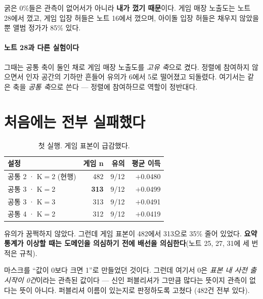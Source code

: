 \documentclass[10pt]{article}
\begin{document}
굵은 0\%들은 관측이 없어서가 아니라 \textbf{내가 껐기 때문}이다. 게임 매장
노출도는 노트 28에서 껐고, 게임 입장 허들은 노트 16에서 껐으며, 아이돌 입장
허들은 채우지 않았을 뿐 앨범 정가가 85\% 있다.

\paragraph{노트 28과 다른 실험이다}
그때는 공통 축이 둘인 채로 게임 매장 노출도를 \emph{고유 축}으로 켰다. 정렬에
참여하지 않으면서 인자 공간의 기하만 흔들어 유의가 6에서 5로 떨어졌고 되돌렸다.
여기서는 같은 축을 \emph{공통 축}으로 쓴다 --- 정렬에 참여하므로 역할이 정반대다.

\section{처음에는 전부 실패했다}

\begin{table}[t]
\centering\tsize
\caption{첫 실행. 게임 표본이 급감했다.}
\begin{tabular}{lrrr}
\toprule
설정 & 게임 n & 유의 & 평균 이득 \\
\midrule
공통 2 · K$=$2 (현행) & 482 & 9/12 & $+$0.0480 \\
공통 3 · K$=$2 & \textbf{313} & 9/12 & $+$0.0499 \\
공통 3 · K$=$3 & 313 & 9/12 & $+$0.0491 \\
공통 4 · K$=$2 & 312 & 9/12 & $+$0.0419 \\
\bottomrule
\end{tabular}
\end{table}

유의가 꿈쩍하지 않았다. 그런데 게임 표본이 482에서 313으로 35\% 줄어 있었다.
\textbf{요약 통계가 이상할 때는 도메인을 의심하기 전에 배선을 의심한다}(노트 25,
27, 31에 세 번 적은 규칙).

마스크를 ``값이 0보다 크면 1''로 만들었던 것이다. 그런데 여기서 0은 \emph{표본
내 사전 출시작이 0건}이라는 관측된 값이다 --- 신인 퍼블리셔가 그만큼 많다는
뜻이지 관측이 없다는 뜻이 아니다. 퍼블리셔 이름이 있는지로 판정하도록 고쳤다
(482건 전부 있다).

\end{document}
